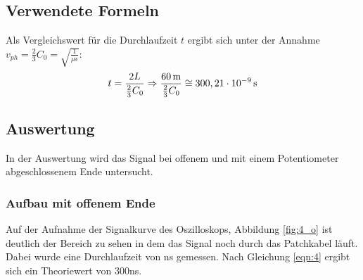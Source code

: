 \documentclass[12pt,a4paper]{article}
\begin{document}
\subsection{Verwendete Formeln}
Als Vergleichswert für die Durchlaufzeit $t$ ergibt sich unter der Annahme $v_{ph} = \frac{2}{3}C_0 = \sqrt{\frac{1}{\mu\epsilon}}$:
\begin{align}
t=\frac{2 L}{\frac{2}{3}C_0} \Rightarrow \frac{\unit[60]{m}}{\frac{2}{3}C_0} \cong \unit[300,21\cdot10^{-9}]{s}
\label{eqn:4}
\end{align}

\subsection{Auswertung}

In der Auswertung wird das Signal bei offenem und mit einem Potentiometer abgeschlossenem Ende untersucht.

\subsubsection{Aufbau mit offenem Ende}

Auf der Aufnahme der Signalkurve des Oszilloskops, Abbildung \ref{fig:4_o} ist deutlich der Bereich zu sehen in dem das Signal noch durch das Patchkabel läuft. Dabei wurde eine Durchlaufzeit von \unit[296]{ns} gemessen. Nach Gleichung \ref{eqn:4} ergibt sich ein Theoriewert von 300ns.
\end{document}

